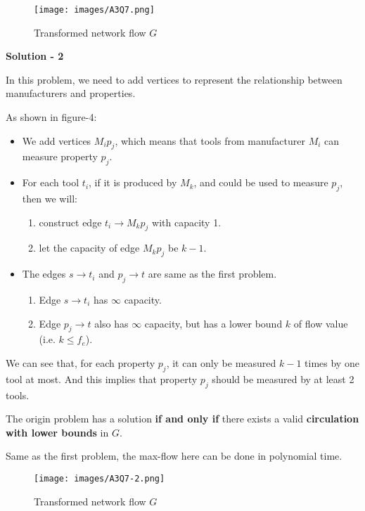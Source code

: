 \documentclass{article}
\newcommand{\<}{
    \langle}
\renewcommand{\>}{
    \rangle}
\begin{document}
{\newpage

\begin{figure}[htp]
    \centering
    \texttt{[image: images/A3Q7.png]}
    \caption{Transformed network flow $G$}
\end{figure}


\bigskip \noindent \textbf{Solution - 2} \bigskip

In this problem, we need to add vertices to represent the relationship between manufacturers and properties.

As shown in figure-4:
\begin{itemize}
    \item We add vertices ${M_i}{p_j}$, which means that tools from manufacturer $M_i$ can measure property $p_j$.
    \item For each tool $t_i$, if it is produced by $M_k$, and could be used to measure $p_j$, then we will:
    \begin{enumerate}[label=\arabic*)]
        \item construct edge $t_i \rightarrow {M_k}{p_j}$ with capacity 1. 
        \item let the capacity of edge ${M_k}{p_j}$ be $k-1$.
    \end{enumerate}
    \item The edges $s \rightarrow t_i$ and $p_j \rightarrow t$ are same as the first problem.
    \begin{enumerate}[label=\arabic*)]
        \item Edge $s \rightarrow t_i$ has $\infty$ capacity.
        \item Edge  $p_j \rightarrow t$ also has $\infty$ capacity, but has a lower bound $k$ of flow value (i.e. $k \le f_e$).
    \end{enumerate}
\end{itemize}


We can see that, for each property $p_j$, it can only be measured $k-1$ times by one tool at most. And this implies that property $p_j$ should be measured by at least 2 tools.

The origin problem has a solution \textbf{if and only if} there exists a valid \textbf{circulation with lower bounds} in $G$.

Same as the first problem, the max-flow here can be done in polynomial time.

\begin{figure}[htp]
    \centering
    \texttt{[image: images/A3Q7-2.png]}
    \caption{Transformed network flow $G$}
\end{figure}

}
\end{document}
